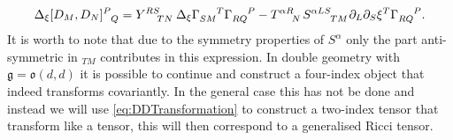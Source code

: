 \begin{equation}\label{eq:DDTransformation}
    \Delta_\xi [D_M,D_N]\tensor{}{^P_Q}= \tensor{Y}{^{RS}_{TN}}\Delta_\xi \tensor{\Gamma}{_{SM}^T}\tensor{\Gamma}{_{RQ}^P}-\tensor{T}{^{\alpha R}_N}\tensor{S}{^{\alpha LS}_{TM}}\pd_L\pd_S\xi^T\tensor{\Gamma}{_{RQ}^P}.
\end{equation}
It is worth to note that due to the symmetry properties of $S^\alpha$ only the part anti-symmetric in $_{TM}$ contributes in this expression. In double geometry with $\mathfrak{g}=\mathfrak{o}(d,d)$ it is possible to continue and construct a four-index object that indeed transforms covariantly. In the general case this has not be done and instead we will use \eqref{eq:DDTransformation} to construct a two-index tensor that transform like a tensor, this will then correspond to a generalised Ricci tensor. 

